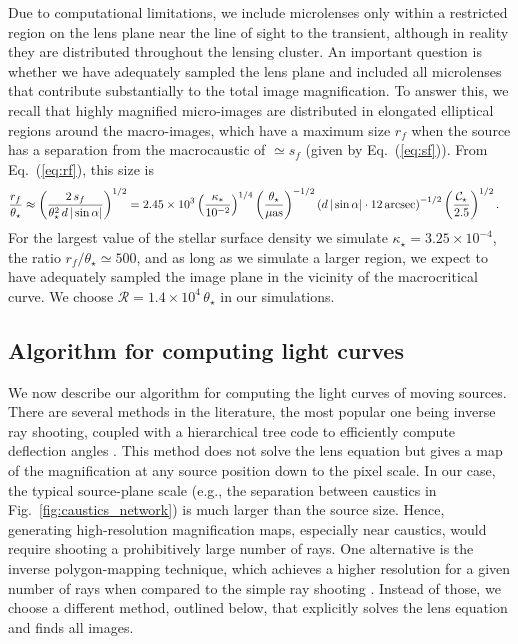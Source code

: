 \documentclass{aastex6}
\newcommand{\refeq}[1]{Eq.~(\ref{eq:#1})}
\newcommand{\reffig}[1]{Fig.~\ref{fig:#1}}
\begin{document}
Due to computational limitations, we include microlenses only within a restricted region on the lens plane near the line of sight to the transient, although in reality they are distributed throughout the lensing cluster. An important question is whether we have adequately sampled the lens plane and included all microlenses that contribute substantially to the total image magnification. To answer this, we recall that highly magnified micro-images are distributed in elongated elliptical regions around the macro-images, which have a maximum size $r_f$ when the source has a separation from the macrocaustic of $\simeq s_f$ (given by \refeq{sf}). From \refeq{rf}, this size is
\begin{align}
  \frac{r_f}{\theta_\star} & \approx
 \left( \frac{2\, s_f}{\theta_\star^2\, d\, \vert \sin{\alpha} \vert } \right)^{1/2}
 = 2.45 \times 10^3 \left( \frac{\kappa_*}{10^{-2}} \right)^{1/4}
 \left( \frac{\theta_\star}{\mu{\rm as}} \right)^{-1/2}
 \left( d\, \vert \sin{\alpha} \vert \cdot 12\, {\rm arcsec} \right)^{-1/2}
 \left( \frac{\mathcal{C}_\star}{2.5} \right)^{1/2} \mbox{.}
\label{eq:pertmacro}
\end{align}
For the largest value of the stellar surface density we simulate $\kappa_\star=3.25\times 10^{-4}$, the ratio $r_f/ \theta_\star \simeq 500$, and as long as we simulate a larger region, we expect to have adequately sampled the image plane in the vicinity of the macrocritical curve. We choose $\mathcal{R} = 1.4 \times 10^{4} \, \theta_\star$ in our simulations. 


\subsection{Algorithm for computing light curves}
\label{sec:lensalg}


We now describe our algorithm for computing the light curves of moving sources. There are several methods in the literature, the most popular one being inverse ray shooting, coupled with a hierarchical tree code to efficiently compute deflection angles \citep[see, e.g.,][and references within]{Garsden2010181}. This method does not solve the lens equation but gives a map of the magnification at any source position down to the pixel scale. In our case, the typical source-plane scale (e.g., the separation between caustics in \reffig{caustics_network}) is much larger than the source size. Hence, generating high-resolution magnification maps, especially near caustics, would require shooting a prohibitively large number of rays. One alternative is the inverse polygon-mapping technique, which achieves a higher resolution for a given number of rays when compared to the simple ray shooting \citep{2006ApJ...653..942M, 2011ApJ...741...42M}. Instead of those, we choose a different method, outlined below, that explicitly solves the lens equation and finds all images. 
\end{document}
